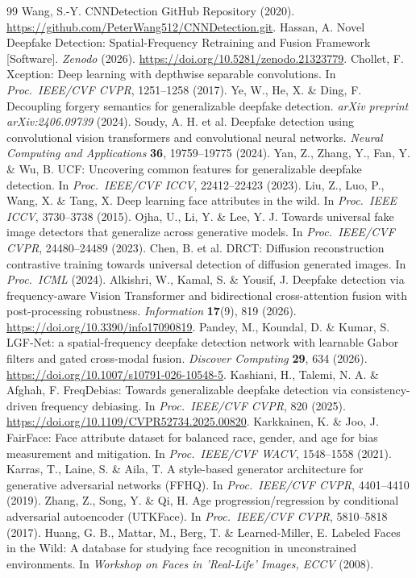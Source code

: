 \documentclass[fleqn,10pt]{wlscirep}
\begin{document}
\begin{thebibliography}{99}
 Wang, S.-Y. CNNDetection GitHub Repository (2020). \url{https://github.com/PeterWang512/CNNDetection.git}.
 Hassan, A. Novel Deepfake Detection: Spatial-Frequency Retraining and Fusion Framework [Software]. \textit{Zenodo} (2026). \url{https://doi.org/10.5281/zenodo.21323779}.
 Chollet, F. Xception: Deep learning with depthwise separable convolutions. In \textit{Proc.\ IEEE/CVF CVPR}, 1251--1258 (2017).
 Ye, W., He, X. \& Ding, F. Decoupling forgery semantics for generalizable deepfake detection. \textit{arXiv preprint arXiv:2406.09739} (2024).
 Soudy, A. H. et al. Deepfake detection using convolutional vision transformers and convolutional neural networks. \textit{Neural Computing and Applications} \textbf{36}, 19759--19775 (2024).
 Yan, Z., Zhang, Y., Fan, Y. \& Wu, B. UCF: Uncovering common features for generalizable deepfake detection. In \textit{Proc.\ IEEE/CVF ICCV}, 22412--22423 (2023).
 Liu, Z., Luo, P., Wang, X. \& Tang, X. Deep learning face attributes in the wild. In \textit{Proc.\ IEEE ICCV}, 3730--3738 (2015).
 Ojha, U., Li, Y. \& Lee, Y. J. Towards universal fake image detectors that generalize across generative models. In \textit{Proc.\ IEEE/CVF CVPR}, 24480--24489 (2023).
 Chen, B. et al. DRCT: Diffusion reconstruction contrastive training towards universal detection of diffusion generated images. In \textit{Proc.\ ICML} (2024).
 Alkishri, W., Kamal, S. \& Yousif, J. Deepfake detection via frequency-aware Vision Transformer and bidirectional cross-attention fusion with post-processing robustness. \textit{Information} \textbf{17}(9), 819 (2026). \url{https://doi.org/10.3390/info17090819}.
 Pandey, M., Koundal, D. \& Kumar, S. LGF-Net: a spatial-frequency deepfake detection network with learnable Gabor filters and gated cross-modal fusion. \textit{Discover Computing} \textbf{29}, 634 (2026). \url{https://doi.org/10.1007/s10791-026-10548-5}.
 Kashiani, H., Talemi, N. A. \& Afghah, F. FreqDebias: Towards generalizable deepfake detection via consistency-driven frequency debiasing. In \textit{Proc.\ IEEE/CVF CVPR}, 820 (2025). \url{https://doi.org/10.1109/CVPR52734.2025.00820}.
 Karkkainen, K. \& Joo, J. FairFace: Face attribute dataset for balanced race, gender, and age for bias measurement and mitigation. In \textit{Proc.\ IEEE/CVF WACV}, 1548--1558 (2021).
 Karras, T., Laine, S. \& Aila, T. A style-based generator architecture for generative adversarial networks (FFHQ). In \textit{Proc.\ IEEE/CVF CVPR}, 4401--4410 (2019).
 Zhang, Z., Song, Y. \& Qi, H. Age progression/regression by conditional adversarial autoencoder (UTKFace). In \textit{Proc.\ IEEE/CVF CVPR}, 5810--5818 (2017).
 Huang, G. B., Mattar, M., Berg, T. \& Learned-Miller, E. Labeled Faces in the Wild: A database for studying face recognition in unconstrained environments. In \textit{Workshop on Faces in 'Real-Life' Images, ECCV} (2008).
\end{thebibliography}
\end{document}
